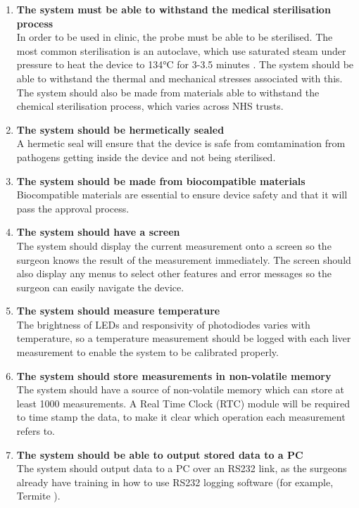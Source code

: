 \begin{enumerate}
\item \label{req: sterilise} \textbf{The system must be able to withstand the medical sterilisation process}\\
In order to be used in clinic, the probe must be able to be sterilised. The most common sterilisation is an autoclave, which use saturated steam under pressure to heat the device to 134\si{\celsius} for 3-3.5 minutes \cite{nhs_autoclave}. The system should be able to withstand the thermal and mechanical stresses associated with this. The system should also be made from materials able to withstand the chemical sterilisation process, which varies across NHS trusts.

\item \label{req: seal} \textbf{The system should be hermetically sealed}\\
A hermetic seal will ensure that the device is safe from comtamination from pathogens getting inside the device and not being sterilised. 

\item \label{req: biocompatible} \textbf{The system should be made from biocompatible materials}\\
Biocompatible materials are essential to ensure device safety and that it will pass the approval process.




\item \label{req: screen} \textbf{The system should have a screen}\\
The system should display the current measurement onto a screen so the surgeon knows the result of the measurement immediately. The screen should also display any menus to select other features and error messages so the surgeon can easily navigate the device.

\item \label{req: temperature} \textbf{The system should measure temperature}\\
The brightness of LEDs and responsivity of photodiodes varies with temperature, so a temperature measurement should be logged with each liver measurement to enable the system to be calibrated properly.

\item \label{req: memory} \textbf{The system should store measurements in non-volatile memory}\\
The system should have a source of non-volatile memory which can store at least 1000 measurements. A Real Time Clock (RTC) module will be required to time stamp the data, to make it clear which operation each measurement refers to.

\item \label{req: rs232} \textbf{The system should be able to output stored data to a PC}\\
The system should output data to a PC over an RS232 link, as the surgeons already have training in how to use RS232 logging software (for example, Termite \cite{termite}).


\end{enumerate}